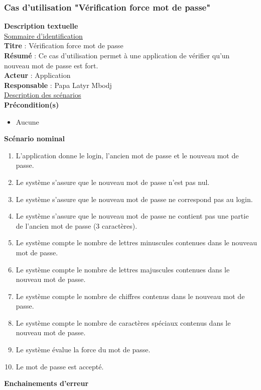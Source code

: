 \subsubsection{Cas d'utilisation "Vérification force mot de passe"}
\textbf{\RIGHTarrow Description textuelle}\\
\underline{\underline{Sommaire d’identification}} \\
\textbf{Titre} : Vérification force mot de passe\\
\textbf{Résumé} : Ce cas d’utilisation permet à une application de vérifier qu'un nouveau mot de passe est fort.\\
\textbf{Acteur} : Application\\	
\textbf{Responsable} : Papa Latyr Mbodj\\
\underline{\underline{Description des scénarios}}\\
\textbf{Précondition(s)}
\begin{itemize}
	\item Aucune
\end{itemize}
\textbf{Scénario nominal}
\begin{enumerate}
	\item L'application donne le login, l'ancien mot de passe et le nouveau mot de passe.
	\item Le système s'assure que le nouveau mot de passe n'est pas nul.
	\item Le système s'assure que le nouveau mot de passe ne correspond pas au login.
	\item Le système s'assure que le nouveau mot de passe ne contient pas une partie de l'ancien mot de passe (3 caractères).
	\item Le système compte le nombre de lettres minuscules contenues dans le nouveau mot de passe.
	\item Le système compte le nombre de lettres majuscules contenues dans le nouveau mot de passe.
	\item Le système compte le nombre de chiffres contenus dans le nouveau mot de passe.
	\item Le système compte le nombre de caractères spéciaux contenus dans le nouveau mot de passe.
	\item Le système évalue la force du mot de passe.
	\item Le mot de passe est accepté.
\end{enumerate}
\textbf{Enchainements d’erreur}\\
